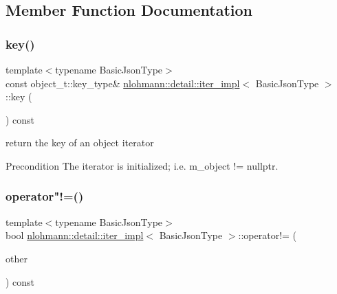 \subsection{Member Function Documentation}
\mbox{\label{classnlohmann_1_1detail_1_1iter__impl_a15dfb2744fed2ef40c12a9e9a20d6dbc}} 
\subsubsection{\texorpdfstring{key()}{key()}}
{\footnotesize\ttfamily template$<$typename Basic\+Json\+Type$>$ \\
const object\+\_\+t\+::key\+\_\+type\& \mbox{\hyperlink{classnlohmann_1_1detail_1_1iter__impl}{nlohmann\+::detail\+::iter\+\_\+impl}}$<$ Basic\+Json\+Type $>$\+::key (\begin{DoxyParamCaption}{ }\end{DoxyParamCaption}) const\hspace{0.3cm}{\ttfamily [inline]}}



return the key of an object iterator 

\begin{DoxyPrecond}{Precondition}
The iterator is initialized; i.\+e. {\ttfamily m\+\_\+object != nullptr}. 
\end{DoxyPrecond}
\mbox{\label{classnlohmann_1_1detail_1_1iter__impl_aeab0e2b5da70b3bdebecd5b1a6ee66a6}} 
\subsubsection{\texorpdfstring{operator"!=()}{operator!=()}}
{\footnotesize\ttfamily template$<$typename Basic\+Json\+Type$>$ \\
bool \mbox{\hyperlink{classnlohmann_1_1detail_1_1iter__impl}{nlohmann\+::detail\+::iter\+\_\+impl}}$<$ Basic\+Json\+Type $>$\+::operator!= (\begin{DoxyParamCaption}\item[{const \mbox{\hyperlink{classnlohmann_1_1detail_1_1iter__impl}{iter\+\_\+impl}}$<$ Basic\+Json\+Type $>$ \&}]{other }\end{DoxyParamCaption}) const\hspace{0.3cm}{\ttfamily [inline]}}



